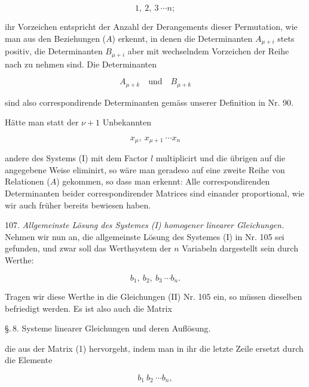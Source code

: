 \[
1,\ 2,\ 3\ \cdots n;
\]

ihr Vorzeichen entspricht der Anzahl der Derangements dieser Permutation, wie man aus den Beziehungen ($A$) erkennt, in denen die Determinanten $A_{\mu+i}$ stets positiv, die Determinanten $B_{\mu+i}$ aber mit wechselndem Vorzeichen der Reihe nach zu nehmen sind. Die Determinanten

\[
A_{\mu+k}\quad \text{und}\quad B_{\mu+k}
\]

sind also correspondirende Determinanten gem\"ass unserer Definition in Nr. 90.

H\"atte man statt der $\nu+1$ Unbekannten

\[
x_\mu,\ x_{\mu+1}\ \cdots x_n
\]

andere des Systems (I) mit dem Factor $l$ multiplicirt und die \"ubrigen auf die angegebene Weise eliminirt, so w\"are man geradeso auf eine zweite Reihe von Relationen ($A$) gekommen, so dass man erkennt: Alle correspondirenden Determinanten beider correspondirender Matrices sind einander proportional, wie wir auch fr\"uher bereits bewiesen haben.

107. \textit{Allgemeinste L\"osung des Systemes (I) homogener linearer Gleichungen.} Nehmen wir nun an, die allgemeinste L\"osung des Systemes (I) in Nr. 105 sei gefunden, und zwar soll das Werthsystem der $n$ Variabeln dargestellt sein durch Werthe:

\[
b_1,\ b_2,\ b_3\ \cdots b_n.
\]

Tragen wir diese Werthe in die Gleichungen (II) Nr. 105 ein, so m\"ussen dieselben befriedigt werden. Es ist also auch die Matrix


\noindent \S.\,8. Systeme linearer Gleichungen und deren Aufl\"osung.


die aus der Matrix (1) hervorgeht, indem man in ihr die letzte Zeile ersetzt durch die Elemente

\[
b_1\ b_2\ \cdots b_n,
\]

